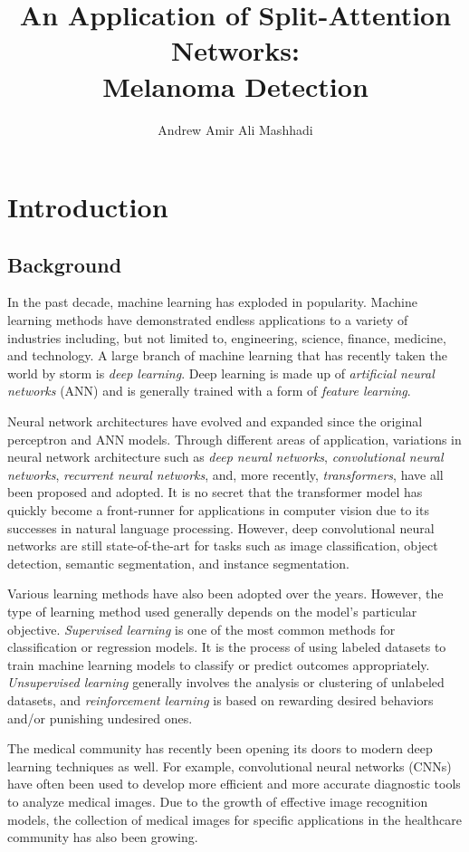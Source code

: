 \documentclass [MAS] {uclathes}
\title          {An Application of Split-Attention Networks:\\
                Melanoma Detection}
\author         {Andrew Amir Ali Mashhadi}
\begin{document}
\makeintropages


\chapter{Introduction}

\section{Background}

In the past decade, machine learning has exploded in popularity. Machine learning methods have demonstrated endless applications to a variety of industries including, but not limited to, engineering, science, finance, medicine, and technology. A large branch of machine learning that has recently taken the world by storm is \textit{deep learning}. Deep learning is made up of \textit{artificial neural networks} (ANN) and is generally trained with a form of \textit{feature learning}. 

Neural network architectures have evolved and expanded since the original perceptron and ANN models. Through different areas of application, variations in neural network architecture such as \textit{deep neural networks}, \textit{convolutional neural networks}, \textit{recurrent neural networks}, and, more recently, \textit{transformers}, have all been proposed and adopted. It is no secret that the transformer model has quickly become a front-runner for applications in computer vision due to its successes in natural language processing. However, deep convolutional neural networks are still state-of-the-art for tasks such as image classification, object detection, semantic segmentation, and instance segmentation.

Various learning methods have also been adopted over the years. However, the type of learning method used generally depends on the model's particular objective. \textit{Supervised learning} is one of the most common methods for classification or regression models. It is the process of using labeled datasets to train machine learning models to classify or predict outcomes appropriately. \textit{Unsupervised learning} generally involves the analysis or clustering of unlabeled datasets, and \textit{reinforcement learning} is based on rewarding desired behaviors and/or punishing undesired ones.

The medical community has recently been opening its doors to modern deep learning techniques as well. For example, convolutional neural networks (CNNs) have often been used to develop more efficient and more accurate diagnostic tools to analyze medical images. Due to the growth of effective image recognition models, the collection of medical images for specific applications in the healthcare community has also been growing. 
\end{document}

